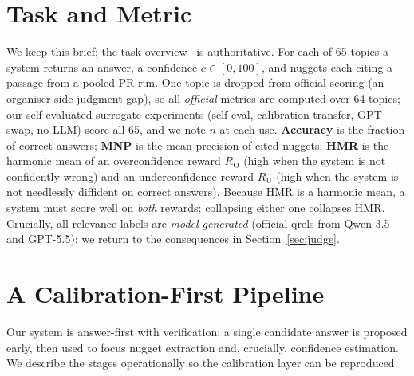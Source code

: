 \documentclass[sigconf,nonacm]{acmart}
\newcommand{\HMR}{\textsc{HMR}}
\newcommand{\MNP}{\textsc{MNP}}
\newcommand{\RO}{R_{\mathrm{O}}}
\newcommand{\RU}{R_{\mathrm{U}}}
\begin{document}
\section{Task and Metric}
\label{sec:task}
We keep this brief; the task overview~\cite{overview} is authoritative. For each of 65
topics a system returns an answer, a confidence $c\in[0,100]$, and nuggets each
citing a passage from a pooled PR run. One topic is dropped from official scoring (an
organiser-side judgment gap), so all \emph{official} metrics are computed over 64 topics;
our self-evaluated surrogate experiments (self-eval, calibration-transfer, GPT-swap,
no-LLM) score all 65, and we note $n$ at each use. \textbf{Accuracy} is the fraction of correct
answers; \textbf{\MNP} is the mean precision of cited nuggets; \textbf{\HMR}
\cite{sakai-hmr} is the harmonic mean of an overconfidence reward $\RO$ (high when the
system is not confidently wrong) and an underconfidence reward $\RU$ (high when the system
is not needlessly diffident on correct answers). Because \HMR{} is a harmonic mean, a
system must score well on \emph{both} rewards; collapsing either one collapses \HMR.
Crucially, all relevance labels are \emph{model-generated} (official qrels from Qwen-3.5
and GPT-5.5); we return to the consequences in Section~\ref{sec:judge}.

\section{A Calibration-First Pipeline}
\label{sec:method}
Our system is answer-first with verification: a single candidate answer is proposed early,
then used to focus nugget extraction and, crucially, confidence estimation. We describe the
stages operationally so the calibration layer can be reproduced.
\end{document}
